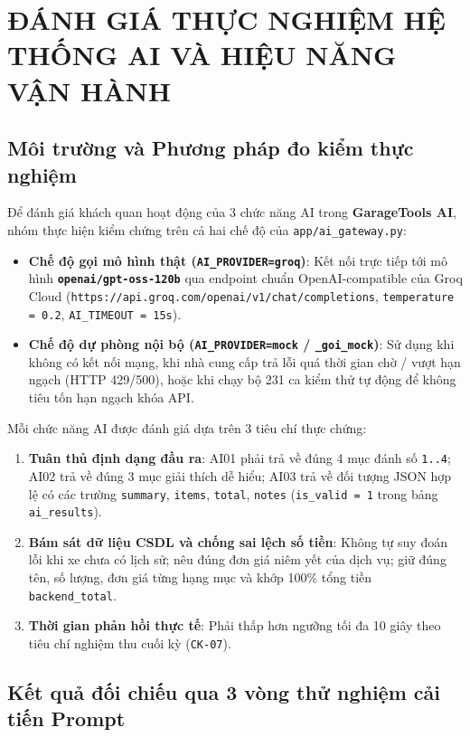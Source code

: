 \chapter{ĐÁNH GIÁ THỰC NGHIỆM HỆ THỐNG AI VÀ HIỆU NĂNG VẬN HÀNH}

\section{Môi trường và Phương pháp đo kiểm thực nghiệm}

Để đánh giá khách quan hoạt động của 3 chức năng AI trong \textbf{GarageTools AI}, nhóm thực hiện kiểm chứng trên cả hai chế độ của \texttt{app/ai\_gateway.py}:
\begin{itemize}[noitemsep,topsep=2pt]
  \item \textbf{Chế độ gọi mô hình thật (\texttt{AI\_PROVIDER=groq})}: Kết nối trực tiếp tới mô hình \textbf{\texttt{openai/gpt-oss-120b}} qua endpoint chuẩn OpenAI-compatible của Groq Cloud (\texttt{https://api.groq.com/openai/v1/chat/completions}, \texttt{temperature = 0.2}, \texttt{AI\_TIMEOUT = 15s}).
  \item \textbf{Chế độ dự phòng nội bộ (\texttt{AI\_PROVIDER=mock} / \texttt{\_goi\_mock})}: Sử dụng khi không có kết nối mạng, khi nhà cung cấp trả lỗi quá thời gian chờ / vượt hạn ngạch (HTTP 429/500), hoặc khi chạy bộ 231 ca kiểm thử tự động để không tiêu tốn hạn ngạch khóa API.
\end{itemize}

Mỗi chức năng AI được đánh giá dựa trên 3 tiêu chí thực chứng:
\begin{enumerate}[noitemsep,topsep=2pt]
  \item \textbf{Tuân thủ định dạng đầu ra}: AI01 phải trả về đúng 4 mục đánh số \texttt{1..4}; AI02 trả về đúng 3 mục giải thích dễ hiểu; AI03 trả về đối tượng JSON hợp lệ có các trường \texttt{summary}, \texttt{items}, \texttt{total}, \texttt{notes} (\texttt{is\_valid = 1} trong bảng \texttt{ai\_results}).
  \item \textbf{Bám sát dữ liệu CSDL và chống sai lệch số tiền}: Không tự suy đoán lỗi khi xe chưa có lịch sử; nêu đúng đơn giá niêm yết của dịch vụ; giữ đúng tên, số lượng, đơn giá từng hạng mục và khớp 100\% tổng tiền \texttt{backend\_total}.
  \item \textbf{Thời gian phản hồi thực tế}: Phải thấp hơn ngưỡng tối đa 10 giây theo tiêu chí nghiệm thu cuối kỳ (\texttt{CK-07}).
\end{enumerate}

\section{Kết quả đối chiếu qua 3 vòng thử nghiệm cải tiến Prompt}

